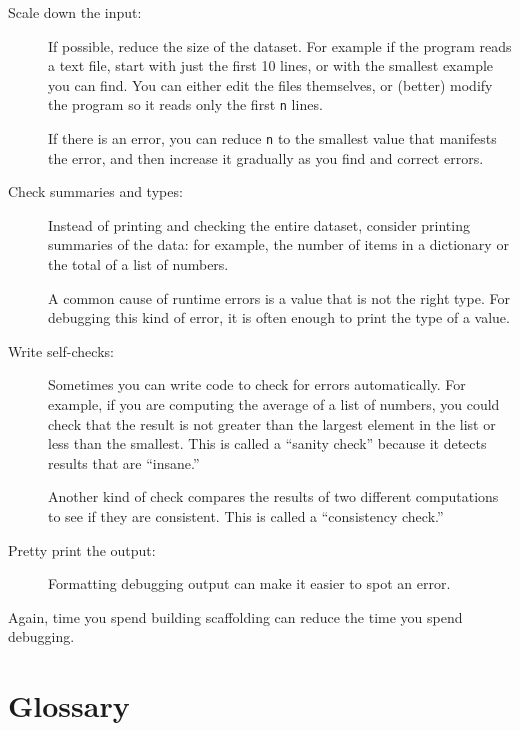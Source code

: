 \documentclass[10pt]{book}
\begin{document}
\begin{description}

\item[Scale down the input:] If possible, reduce the size of the
dataset.  For example if the program reads a text file, start with
just the first 10 lines, or with the smallest example you can find.
You can either edit the files themselves, or (better) modify the
program so it reads only the first {\tt n} lines.

If there is an error, you can reduce {\tt n} to the smallest
value that manifests the error, and then increase it gradually
as you find and correct errors.

\item[Check summaries and types:] Instead of printing and checking the
entire dataset, consider printing summaries of the data: for example,
the number of items in a dictionary or the total of a list of numbers.

A common cause of runtime errors is a value that is not the right
type.  For debugging this kind of error, it is often enough to print
the type of a value.

\item[Write self-checks:]  Sometimes you can write code to check
for errors automatically.  For example, if you are computing the
average of a list of numbers, you could check that the result is
not greater than the largest element in the list or less than
the smallest.  This is called a ``sanity check'' because it detects
results that are ``insane.''


Another kind of check compares the results of two different
computations to see if they are consistent.  This is called a
``consistency check.''

\item[Pretty print the output:] Formatting debugging output
can make it easier to spot an error.  

\end{description}

Again, time you spend building scaffolding can reduce
the time you spend debugging.


\section{Glossary}
\end{document}
